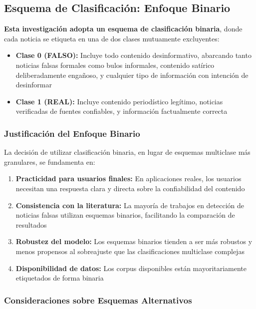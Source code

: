 \subsection{Esquema de Clasificación: Enfoque Binario}
\label{subsec:esquema_clasificacion}

\textbf{Esta investigación adopta un esquema de clasificación binaria}, donde cada noticia se etiqueta en una de dos clases mutuamente excluyentes:

\begin{itemize}
    \item \textbf{Clase 0 (FALSO):} Incluye todo contenido desinformativo, abarcando tanto noticias falsas formales como bulos informales, contenido satírico deliberadamente engañoso, y cualquier tipo de información con intención de desinformar
    \item \textbf{Clase 1 (REAL):} Incluye contenido periodístico legítimo, noticias verificadas de fuentes confiables, y información factualmente correcta
\end{itemize}

\subsubsection{Justificación del Enfoque Binario}

La decisión de utilizar clasificación binaria, en lugar de esquemas multiclase más granulares, se fundamenta en:

\begin{enumerate}
    \item \textbf{Practicidad para usuarios finales:} En aplicaciones reales, los usuarios necesitan una respuesta clara y directa sobre la confiabilidad del contenido
    \item \textbf{Consistencia con la literatura:} La mayoría de trabajos en detección de noticias falsas utilizan esquemas binarios, facilitando la comparación de resultados
    \item \textbf{Robustez del modelo:} Los esquemas binarios tienden a ser más robustos y menos propensos al sobreajuste que las clasificaciones multiclase complejas
    \item \textbf{Disponibilidad de datos:} Los corpus disponibles están mayoritariamente etiquetados de forma binaria
\end{enumerate}

\subsubsection{Consideraciones sobre Esquemas Alternativos}

